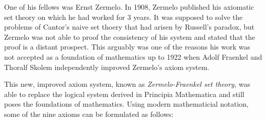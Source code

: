 \documentclass[hidelinks]{article}
\begin{document}
One of his fellows was Ernst Zermelo. In 1908, Zermelo published his axiomatic set theory on which he had worked for 3 years. It was supposed to solve the problems of Cantor's naive set thoery that had arisen by Russell's paradox, but Zermelo was not able to proof the consistency of his system and stated that the proof is a distant prospect. This arguably was one of the reasons his work was not accepted as a foundation of mathematics up to 1922 when Adolf Fraenkel and Thoralf Skolem independently improved Zermelo's axiom system. 

This new, improved axiom system, known as \textit{Zermelo-Fraenkel set theory}, was able to replace the logical system derived in Principia Mathematica and still poses the foundations of mathematics. Using modern mathematicial notation, some of the nine axioms can be formulated as follows:
\small
\end{document}
